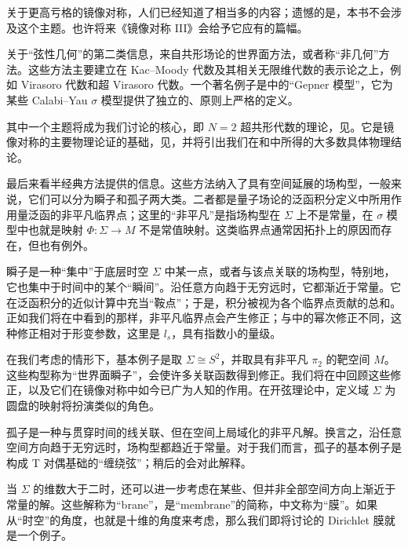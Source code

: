 关于更高亏格的镜像对称，人们已经知道了相当多的内容；遗憾的是，本书不会涉及这个主题。也许将来《镜像对称 III》会给予它应有的篇幅。

关于“弦性几何”的第二类信息，来自共形场论的世界面方法，或者称“非几何”方法。这些方法主要建立在 Kac--Moody 代数及其相关无限维代数的表示论之上，例如 Virasoro 代数和超 Virasoro 代数。一个著名例子是中的“Gepner 模型”，它为某些 Calabi--Yau $\sigma$ 模型提供了独立的、原则上严格的定义。

其中一个主题将成为我们讨论的核心，即 $N=2$ 超共形代数的理论，见。它是镜像对称的主要物理论证的基础，见，并将引出我们在和中所得的大多数具体物理结论。

最后来看半经典方法提供的信息。这些方法纳入了具有空间延展的场构型，一般来说，它们可以分为瞬子和孤子两大类。二者都是量子场论的泛函积分定义中所用作用量泛函的非平凡临界点；这里的“非平凡”是指场构型在 $\Sigma$ 上不是常量，在 $\sigma$ 模型中也就是映射 $\Phi\colon\Sigma\to M$ 不是常值映射。这类临界点通常因拓扑上的原因而存在，但也有例外。

瞬子是一种“集中”于底层时空 $\Sigma$ 中某一点，或者与该点关联的场构型，特别地，它也集中于时间中的某个“瞬间”。沿任意方向趋于无穷远时，它都渐近于常量。它在泛函积分的近似计算中充当“鞍点”；于是，积分被视为各个临界点贡献的总和。正如我们将在中看到的那样，非平凡临界点会产生修正；与中的幂次修正不同，这种修正相对于形变参数，这里是 $l_s$，具有指数小的量级。

在我们考虑的情形下，基本例子是取 $\Sigma\cong S^2$，并取具有非平凡 $\pi_2$ 的靶空间 $M$。这些构型称为“世界面瞬子”，会使许多关联函数得到修正。我们将在中回顾这些修正，以及它们在镜像对称中如今已广为人知的作用。在开弦理论中，定义域 $\Sigma$ 为圆盘的映射将扮演类似的角色。

孤子是一种与贯穿时间的线关联、但在空间上局域化的非平凡解。换言之，沿任意空间方向趋于无穷远时，场构型都趋近于常量。对于我们而言，孤子的基本例子是构成 T 对偶基础的“缠绕弦”；稍后的会对此解释。

当 $\Sigma$ 的维数大于二时，还可以进一步考虑在某些、但并非全部空间方向上渐近于常量的解。这些解称为“brane”，是“membrane”的简称，中文称为“膜”。如果从“时空”的角度，也就是十维的角度来考虑，那么我们即将讨论的 Dirichlet 膜就是一个例子。

